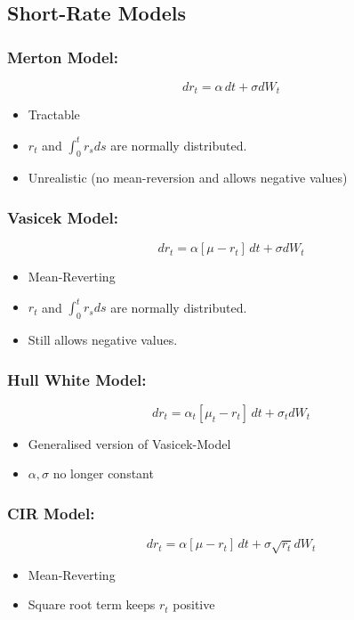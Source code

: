 \documentclass[11pt]{article}
\begin{document}
	\subsection{Short-Rate Models}
	\subsubsection{Merton Model:}
	\[	
		dr_t = \alpha \, dt + \sigma dW_t
			\]
	\begin{itemize}
		\item Tractable
		\item \( r_t \) and \(\int_{0}^{t} r_sds \) are normally distributed.
		\item Unrealistic (no mean-reversion and allows negative values)
		\end{itemize}
	
	\subsubsection{Vasicek Model:}
	\[	dr_t = \alpha \left[\mu - r_t\right] \, dt + \sigma dW_t
		\]
	\begin{itemize}
		\item Mean-Reverting
		\item \( r_t \) and \(\int_{0}^{t} r_sds \) are normally distributed.
		\item Still allows negative values.
		\end{itemize}
	
	\subsubsection{Hull White Model:}
	\[	
	dr_t = \alpha_t\left[\mu_t - r_t\right]\, dt + \sigma_tdW_t
	\]
	\begin{itemize}
		\item Generalised version of Vasicek-Model
		\item \( \alpha,\sigma \) no longer constant
	\end{itemize}

	\subsubsection{CIR Model:}
	\[	dr_t = \alpha\left[\mu - r_t\right]\, dt + \sigma\sqrt{r_t} dW_t
		\]
		\begin{itemize}
		\item Mean-Reverting
		\item Square root term keeps \( r_t \) positive
	\end{itemize}
\end{document}
